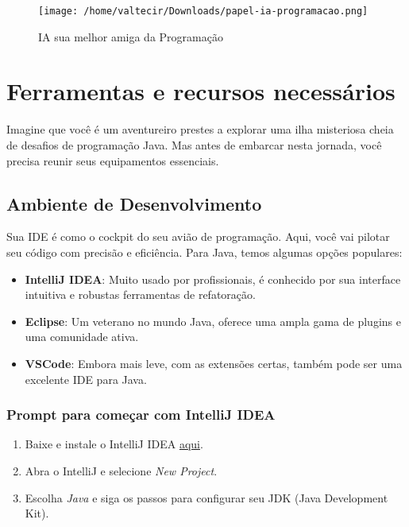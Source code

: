 \documentclass[a4paper,12pt]{book}
\begin{document}
\begin{figure}[!b]
    \centering
    \texttt{[image: /home/valtecir/Downloads/papel-ia-programacao.png]}
    \caption{IA sua melhor amiga da Programação}
    \label{fig:exemplo}
\end{figure}


\chapter{Ferramentas e recursos necessários}
Imagine que você é um aventureiro prestes a explorar uma ilha misteriosa cheia de desafios de programação Java. Mas antes de embarcar nesta jornada, você precisa reunir seus equipamentos essenciais.

\section{Ambiente de Desenvolvimento}

Sua IDE é como o cockpit do seu avião de programação. Aqui, você vai pilotar seu código com precisão e eficiência. Para Java, temos algumas opções populares:

\begin{itemize}
    \item \textbf{IntelliJ IDEA}: Muito usado por profissionais, é conhecido por sua interface intuitiva e robustas ferramentas de refatoração.
    \item \textbf{Eclipse}: Um veterano no mundo Java, oferece uma ampla gama de plugins e uma comunidade ativa.
    \item \textbf{VSCode}: Embora mais leve, com as extensões certas, também pode ser uma excelente IDE para Java.
\end{itemize}

\subsection{Prompt para começar com IntelliJ IDEA}
\begin{enumerate}
    \item Baixe e instale o IntelliJ IDEA \href{https://www.jetbrains.com/idea/download/}{aqui}.
    \item Abra o IntelliJ e selecione \textit{New Project}.
    \item Escolha \textit{Java} e siga os passos para configurar seu JDK (Java Development Kit).
\end{enumerate}
\end{document}
